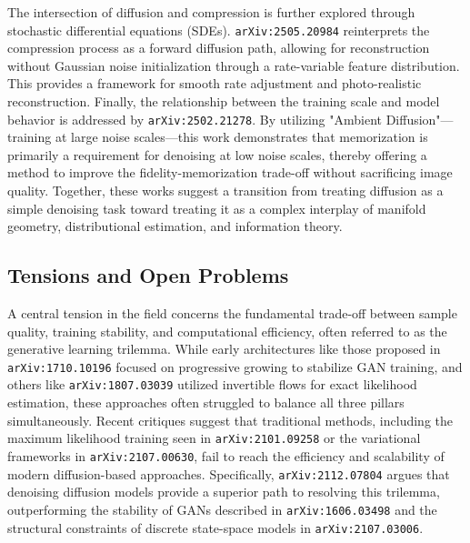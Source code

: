 \documentclass[11pt]{article}
\begin{document}
The intersection of diffusion and compression is further explored through stochastic differential equations (SDEs). \texttt{arXiv:2505.20984} reinterprets the compression process as a forward diffusion path, allowing for reconstruction without Gaussian noise initialization through a rate-variable feature distribution. This provides a framework for smooth rate adjustment and photo-realistic reconstruction. Finally, the relationship between the training scale and model behavior is addressed by \texttt{arXiv:2502.21278}. By utilizing "Ambient Diffusion"—training at large noise scales—this work demonstrates that memorization is primarily a requirement for denoising at low noise scales, thereby offering a method to improve the fidelity-memorization trade-off without sacrificing image quality. Together, these works suggest a transition from treating diffusion as a simple denoising task toward treating it as a complex interplay of manifold geometry, distributional estimation, and information theory.

\subsection{Tensions and Open Problems}

A central tension in the field concerns the fundamental trade-off between sample quality, training stability, and computational efficiency, often referred to as the generative learning trilemma. While early architectures like those proposed in \texttt{arXiv:1710.10196} focused on progressive growing to stabilize GAN training, and others like \texttt{arXiv:1807.03039} utilized invertible flows for exact likelihood estimation, these approaches often struggled to balance all three pillars simultaneously. Recent critiques suggest that traditional methods, including the maximum likelihood training seen in \texttt{arXiv:2101.09258} or the variational frameworks in \texttt{arXiv:2107.00630}, fail to reach the efficiency and scalability of modern diffusion-based approaches. Specifically, \texttt{arXiv:2112.07804} argues that denoising diffusion models provide a superior path to resolving this trilemma, outperforming the stability of GANs described in \texttt{arXiv:1606.03498} and the structural constraints of discrete state-space models in \texttt{arXiv:2107.03006}.
\end{document}
